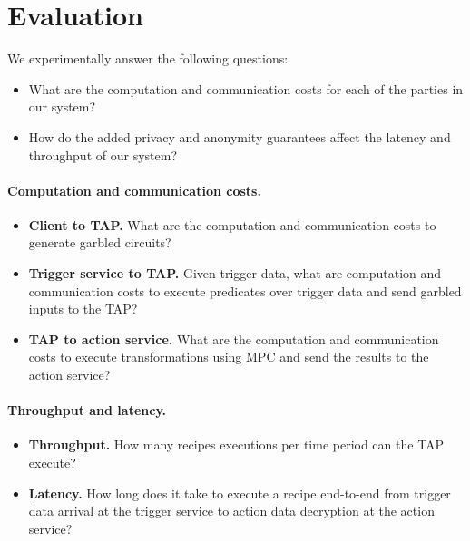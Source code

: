 \section{Evaluation}
\label{sec:evaluation}

We experimentally answer the following questions:
\begin{itemize}
  \item What are the computation and communication costs for each of the parties
    in our system?
  \item How do the added privacy and anonymity guarantees affect the latency and
    throughput of our system?
\end{itemize}

\paragraph{Computation and communication costs.}
\begin{itemize}
  \item \textbf{Client to TAP.} What are the computation and communication costs
    to generate garbled circuits?
  \item \textbf{Trigger service to TAP.} Given trigger data, what are
    computation and communication costs to execute predicates over trigger data
    and send garbled inputs to the TAP?
  \item \textbf{TAP to action service.} What are the computation and
    communication costs to execute transformations using MPC and send the
    results to the action service?
\end{itemize}

\paragraph{Throughput and latency.}
\begin{itemize}
  \item \textbf{Throughput.} How many recipes executions per time period can the
    TAP execute?
  \item \textbf{Latency.} How long does it take to execute a recipe end-to-end
    from trigger data arrival at the trigger service to action data decryption
    at the action service?
\end{itemize}

